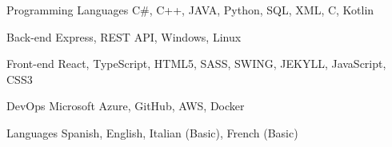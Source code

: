 

\begin{cvskills}
   \cvskill
{Programming Languages} %
{C#, C++, JAVA, Python, SQL, XML, C, Kotlin} %

\cvskill
{Back-end} %
{Express, REST API, Windows, Linux} %


\cvskill
{Front-end} %
{React, TypeScript, HTML5, SASS, SWING, JEKYLL, JavaScript, CSS3} %

\cvskill
{DevOps} %
{Microsoft Azure, GitHub, AWS, Docker} %

\cvskill
{Languages} %
{Spanish, English, Italian (Basic), French (Basic)} %



   

\end{cvskills}
